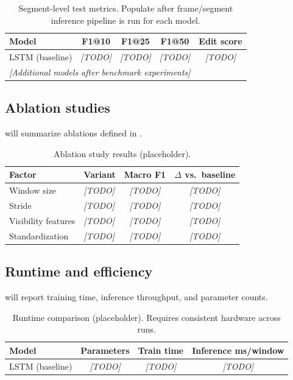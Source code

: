 \begin{table}[t]
  \centering
  \caption{Segment-level test metrics. Populate after frame/segment inference pipeline is run for each model.}
  \label{tab:segment_metrics}
  \begin{tabular}{lcccc}
    \toprule
    Model & F1@10 & F1@25 & F1@50 & Edit score \\
    \midrule
    LSTM (baseline) & \textit{[TODO]} & \textit{[TODO]} & \textit{[TODO]} & \textit{[TODO]} \\
    \multicolumn{5}{l}{\textit{[Additional models after benchmark experiments]}} \\
    \bottomrule
  \end{tabular}
\end{table}

\subsection{Ablation studies}
\label{sec:results:ablation}

 will summarize ablations defined in .

\begin{table}[t]
  \centering
  \caption{Ablation study results (placeholder).}
  \label{tab:ablation}
  \begin{tabular}{llcc}
    \toprule
    Factor & Variant & Macro F1 & $\Delta$ vs.\ baseline \\
    \midrule
    Window size & \textit{[TODO]} & \textit{[TODO]} & \textit{[TODO]} \\
    Stride & \textit{[TODO]} & \textit{[TODO]} & \textit{[TODO]} \\
    Visibility features & \textit{[TODO]} & \textit{[TODO]} & \textit{[TODO]} \\
    Standardization & \textit{[TODO]} & \textit{[TODO]} & \textit{[TODO]} \\
    \bottomrule
  \end{tabular}
\end{table}

\subsection{Runtime and efficiency}
\label{sec:results:runtime}

 will report training time, inference throughput, and parameter counts.

\begin{table}[t]
  \centering
  \caption{Runtime comparison (placeholder). Requires consistent hardware across runs.}
  \label{tab:runtime}
  \begin{tabular}{lccc}
    \toprule
    Model & Parameters & Train time & Inference ms/window \\
    \midrule
    LSTM (baseline) & \textit{[TODO]} & \textit{[TODO]} & \textit{[TODO]} \\
    \bottomrule
  \end{tabular}
\end{table}

